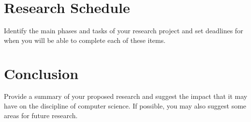 \documentclass[11pt]{article}
\begin{document}
\vspace*{-.1in}
\section{Research Schedule}
\label{sec:schedule}
\vspace*{-.1in}

Identify the main phases and tasks of your research project and set
deadlines for when you will be able to complete each of these items.

\vspace*{-.1in}
\section{Conclusion}
\label{sec:conclusion}
\vspace*{-.1in}


Provide a summary of your proposed research and suggest the impact
that it may have on the discipline of computer science.  If possible,
you may also suggest some areas for future research.



\end{document}
